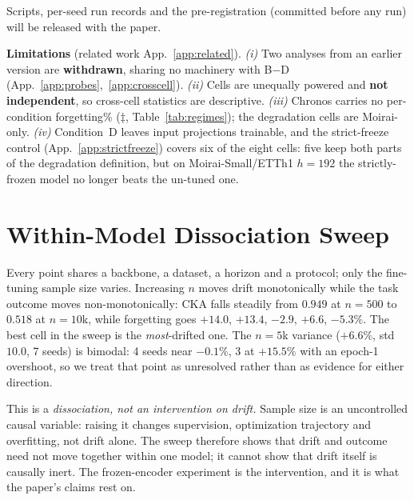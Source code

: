 \documentclass{article}
\begin{document}
Scripts, per-seed run records and the
pre-registration (committed before any run) will be released with the paper.

\textbf{Limitations} (related work App.~\ref{app:related}). \emph{(i)} Two analyses from an earlier version are \textbf{withdrawn}, sharing no machinery with B$-$D (App.~\ref{app:probes},~\ref{app:crosscell}). \emph{(ii)} Cells are unequally powered and \textbf{not independent}, so cross-cell statistics are descriptive. \emph{(iii)} Chronos carries no per-condition forgetting\% ($\ddagger$, Table~\ref{tab:regimes}); the degradation cells are Moirai-only. \emph{(iv)} Condition~D leaves input projections trainable, and the strict-freeze control (App.~\ref{app:strictfreeze}) covers six of the eight cells: five keep both parts of the degradation definition, but on Moirai-Small/ETTh1 $h{=}192$ the strictly-frozen model no longer beats the un-tuned one.




\appendix

\section{Within-Model Dissociation Sweep}
\label{app:sweep}

Every point shares a backbone, a dataset, a horizon and a protocol; only the fine-tuning sample size
varies. Increasing $n$ moves drift monotonically while the task outcome moves non-monotonically:
CKA falls steadily from $0.949$ at
$n{=}500$ to $0.518$ at $n{=}10$k, while forgetting goes $+14.0$, $+13.4$, $-2.9$, $+6.6$,
$-5.3\%$. The best cell in the sweep is the \emph{most}-drifted one.
The $n{=}5$k variance ($+6.6\%$, std $10.0$, 7 seeds) is bimodal: 4 seeds near $-0.1\%$, 3 at
$+15.5\%$ with an epoch-1 overshoot, so we treat that point as unresolved rather than as evidence
for either direction.

This is a \emph{dissociation, not an intervention on drift.} Sample size is an uncontrolled causal
variable: raising it changes supervision, optimization trajectory and overfitting, not drift alone.
The sweep therefore shows that drift and outcome need not move together within one model; it cannot
show that drift itself is causally inert. The frozen-encoder experiment is the intervention, and it
is what the paper's claims rest on.
\end{document}
